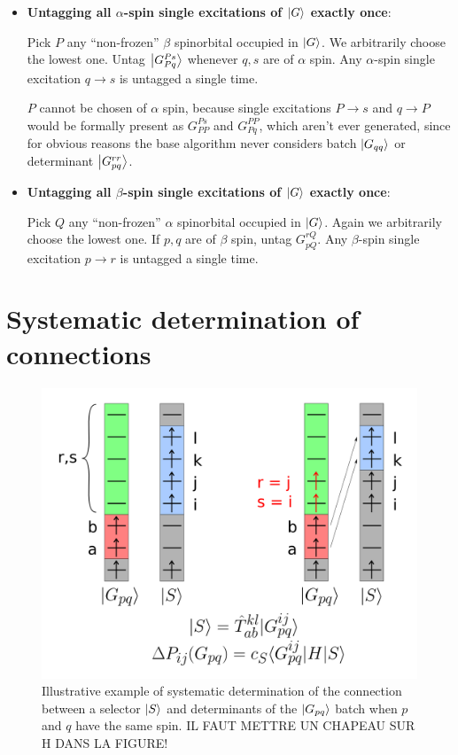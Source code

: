 \documentclass[./thesis.tex]{subfiles}
\begin{document}
\begin{itemize}
\item
\textbf{Untagging all $\alpha$-spin single excitations of $\ket G$ exactly once}:

Pick $P$ any ``non-frozen'' $\beta$ spinorbital occupied in $\ket G$. We arbitrarily choose the lowest one. Untag $\ket {G_{Pq}^{Ps}}$ whenever $q,s$ are of $\alpha$ spin. Any $\alpha$-spin single excitation $q \rightarrow  s$ is untagged a single time.

$P$ cannot be chosen of $\alpha$ spin, because single excitations $P \rightarrow  s$ and $q \rightarrow  P$ would be formally present as $G_{PP}^{Ps}$ and $G_{Pq}^{PP}$, which aren't ever generated, since for obvious reasons the base algorithm never considers batch $\ket {G_{qq}}$ or determinant $\ket {G_{pq}^{rr}}$.
\item
\textbf{Untagging all $\beta$-spin single excitations of $\ket G$ exactly once}:

Pick $Q$ any ``non-frozen'' $\alpha$ spinorbital occupied in $\ket G$. Again we arbitrarily choose the lowest one. If $p,q$ are of $\beta$ spin, untag $G_{pQ}^{rQ}$. Any $\beta$-spin single excitation $p \rightarrow  r$ is untagged a single time.
\end{itemize}



\section{Systematic determination of connections}

\begin{figure}[h!]
        \begin{center}
                \includegraphics[width=0.70\columnwidth]{figures/cipsi/systematic_determination}
        \end{center}
        \caption{Illustrative example of systematic determination of the connection between a selector $\ket S$ and determinants of the $\ket {G_{pq}}$ batch when $p$ and $q$ have the same spin. \alert{IL FAUT METTRE UN CHAPEAU SUR H DANS LA FIGURE!}}
        \label{fig:systematic_determination}
        
\end{figure}
\end{document}
